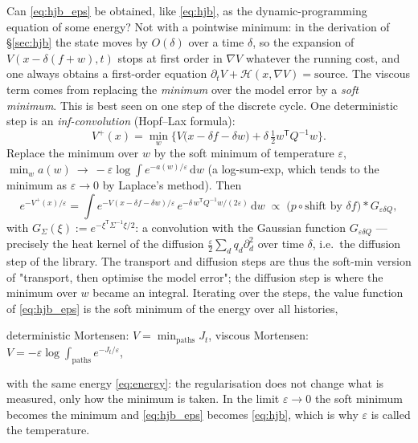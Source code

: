 \documentclass[11pt,a4paper]{article}
\newcommand{\dd}{\,\mathrm{d}}
\newcommand{\T}{^{\mathsf T}}
\newcommand{\eps}{\varepsilon}
\newcommand{\grad}{\nabla}
\theoremstyle{plain}
\theoremstyle{definition}
\theoremstyle{remark}
\begin{document}
Can \eqref{eq:hjb_eps} be obtained, like \eqref{eq:hjb}, as the dynamic-programming equation of some energy? Not with a pointwise minimum: in the derivation of \S\ref{sec:hjb} the state moves by $O(\delta)$ over a time $\delta$, so the expansion of $V(x-\delta(f+w),t)$ stops at first order in $\grad V$ whatever the running cost, and one always obtains a first-order equation $\partial_tV + \mathcal H(x,\grad V)=\text{source}$. The viscous term comes from replacing the \emph{minimum} over the model error by a \emph{soft minimum}. This is best seen on one step of the discrete cycle. One deterministic step is an \emph{inf-convolution} (Hopf--Lax formula):
\[
  V^+(x) = \min_w\Big\{V\big(x-\delta f-\delta w\big) + \delta\,\tfrac12 w\T Q^{-1}w\Big\}.
\]
Replace the minimum over $w$ by the soft minimum of temperature $\eps$, $\min_w a(w)\ \to\ -\eps\log\int e^{-a(w)/\eps}\dd w$ (a log-sum-exp, which tends to the minimum as $\eps\to0$ by Laplace's method). Then
\[
  e^{-V^+(x)/\eps} = \int e^{-V(x-\delta f-\delta w)/\eps}\, e^{-\delta\, w\T Q^{-1}w/(2\eps)}\dd w
  \;\propto\; \big(p\circ\text{shift by }\delta f\big) * G_{\eps\delta Q},
\]
with $G_\Sigma(\xi) := e^{-\xi\T\Sigma^{-1}\xi/2}$: a convolution with the Gaussian function $G_{\eps\delta Q}$ --- precisely the heat kernel of the diffusion $\tfrac{\eps}{2}\sum_d q_d\partial_d^2$ over time $\delta$, i.e.\ the diffusion step of the library. The transport and diffusion steps are thus the soft-min version of "transport, then optimise the model error"; the diffusion step is where the minimum over $w$ became an integral. Iterating over the steps, the value function of \eqref{eq:hjb_eps} is the soft minimum of the energy over all histories,
\begin{center}
  deterministic Mortensen: $V=\displaystyle\min_{\text{paths}} J_t$, \qquad
  viscous Mortensen: $V = -\eps\log\displaystyle\int_{\text{paths}} e^{-J_t/\eps}$,
\end{center}
with the same energy \eqref{eq:energy}: the regularisation does not change what is measured, only how the minimum is taken. In the limit $\eps\to0$ the soft minimum becomes the minimum and \eqref{eq:hjb_eps} becomes \eqref{eq:hjb}, which is why $\eps$ is called the temperature.
\end{document}
